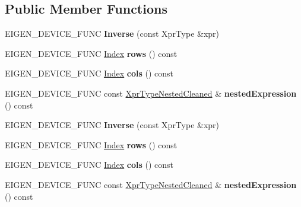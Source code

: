 \subsection*{Public Member Functions}
\begin{DoxyCompactItemize}
\item 
\mbox{\label{class_eigen_1_1_inverse_ac3dcdb58c1416882e33b90c5547589c0}} 
E\+I\+G\+E\+N\+\_\+\+D\+E\+V\+I\+C\+E\+\_\+\+F\+U\+NC {\bfseries Inverse} (const Xpr\+Type \&xpr)
\item 
\mbox{\label{class_eigen_1_1_inverse_af41ff0c72ffb6782474bab6e1ec2ac11}} 
E\+I\+G\+E\+N\+\_\+\+D\+E\+V\+I\+C\+E\+\_\+\+F\+U\+NC \hyperlink{namespace_eigen_a62e77e0933482dafde8fe197d9a2cfde}{Index} {\bfseries rows} () const
\item 
\mbox{\label{class_eigen_1_1_inverse_a506af9d762f0285fe8bd719fff034e4d}} 
E\+I\+G\+E\+N\+\_\+\+D\+E\+V\+I\+C\+E\+\_\+\+F\+U\+NC \hyperlink{namespace_eigen_a62e77e0933482dafde8fe197d9a2cfde}{Index} {\bfseries cols} () const
\item 
\mbox{\label{class_eigen_1_1_inverse_ab112d1c3a08075a9f978df4ced8e2152}} 
E\+I\+G\+E\+N\+\_\+\+D\+E\+V\+I\+C\+E\+\_\+\+F\+U\+NC const \hyperlink{group___sparse_core___module}{Xpr\+Type\+Nested\+Cleaned} \& {\bfseries nested\+Expression} () const
\item 
\mbox{\label{class_eigen_1_1_inverse_ac3dcdb58c1416882e33b90c5547589c0}} 
E\+I\+G\+E\+N\+\_\+\+D\+E\+V\+I\+C\+E\+\_\+\+F\+U\+NC {\bfseries Inverse} (const Xpr\+Type \&xpr)
\item 
\mbox{\label{class_eigen_1_1_inverse_af41ff0c72ffb6782474bab6e1ec2ac11}} 
E\+I\+G\+E\+N\+\_\+\+D\+E\+V\+I\+C\+E\+\_\+\+F\+U\+NC \hyperlink{namespace_eigen_a62e77e0933482dafde8fe197d9a2cfde}{Index} {\bfseries rows} () const
\item 
\mbox{\label{class_eigen_1_1_inverse_a506af9d762f0285fe8bd719fff034e4d}} 
E\+I\+G\+E\+N\+\_\+\+D\+E\+V\+I\+C\+E\+\_\+\+F\+U\+NC \hyperlink{namespace_eigen_a62e77e0933482dafde8fe197d9a2cfde}{Index} {\bfseries cols} () const
\item 
\mbox{\label{class_eigen_1_1_inverse_ab112d1c3a08075a9f978df4ced8e2152}} 
E\+I\+G\+E\+N\+\_\+\+D\+E\+V\+I\+C\+E\+\_\+\+F\+U\+NC const \hyperlink{group___sparse_core___module}{Xpr\+Type\+Nested\+Cleaned} \& {\bfseries nested\+Expression} () const
\end{DoxyCompactItemize}
